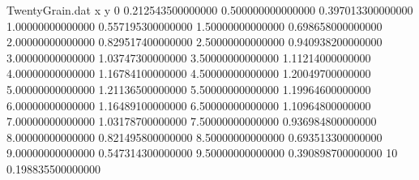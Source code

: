 \begin{filecontents}{TwentyGrain.dat}
x y
0	0.212543500000000
0.500000000000000	0.397013300000000
1.00000000000000	0.557195300000000
1.50000000000000	0.698658000000000
2.00000000000000	0.829517400000000
2.50000000000000	0.940938200000000
3.00000000000000	1.03747300000000
3.50000000000000	1.11214000000000
4.00000000000000	1.16784100000000
4.50000000000000	1.20049700000000
5.00000000000000	1.21136500000000
5.50000000000000	1.19964600000000
6.00000000000000	1.16489100000000
6.50000000000000	1.10964800000000
7.00000000000000	1.03178700000000
7.50000000000000	0.936984800000000
8.00000000000000	0.821495800000000
8.50000000000000	0.693513300000000
9.00000000000000	0.547314300000000
9.50000000000000	0.390898700000000
10	0.198835500000000
\end{filecontents}

